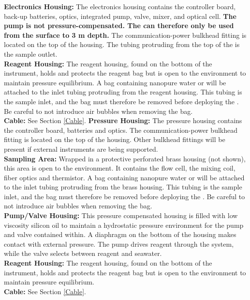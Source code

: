 \ifiSAMI
    \textbf{Electronics Housing:} The electronics housing contains the controller board, back-up batteries, optics, integrated pump, valve, mixer, and optical cell. \textbf{The \instType{} pump is not pressure-compensated. The \instType{} can therefore only be used from the surface to 3 m depth.} The communication-power bulkhead fitting is located on the top of the housing. The tubing protruding from the top of the \instType{} is the sample outlet.\\
    
    \textbf{Reagent Housing:} The reagent housing, found on the bottom of the instrument, holds and protects the reagent bag but is open to the environment to maintain pressure equilibrium. A bag containing nanopure water or  will be attached to the inlet tubing protruding from the reagent housing. This tubing is the sample inlet, and the bag must therefore be removed before deploying the \instType{}. Be careful to not introduce air bubbles when removing the bag.\\
    
    \textbf{Cable:} See Section \ref{Cable}.
\else
    \textbf{Pressure Housing:} The pressure housing contains the controller board, batteries and optics. The communication-power bulkhead fitting is located on the top of the housing. Other bulkhead fittings will be present if external instruments are being supported.\\
    
    \textbf{Sampling Area:} Wrapped in a protective perforated brass housing (not shown), this area is open to the environment. It contains the flow cell, the mixing coil, fiber optics and thermistor. A bag containing nanopure water or  will be attached to the inlet tubing protruding from the brass housing. This tubing is the sample inlet, and the bag must therefore be removed before deploying the \instType{}. Be careful to not introduce air bubbles when removing the bag.\\
    
    \textbf{Pump/Valve Housing:} This pressure compensated housing is filled with low viscosity silicon oil to maintain a hydrostatic pressure environment for the pump and valve contained within. A diaphragm on the bottom of the housing makes contact with external pressure. The pump drives reagent through the system, while the valve selects between reagent and seawater.\\
    
    \textbf{Reagent Housing:} The reagent housing, found on the bottom of the instrument, holds and protects the reagent bag but is open to the environment to maintain pressure equilibrium.\\
    
    \textbf{Cable:} See Section \ref{Cable}.
\fi